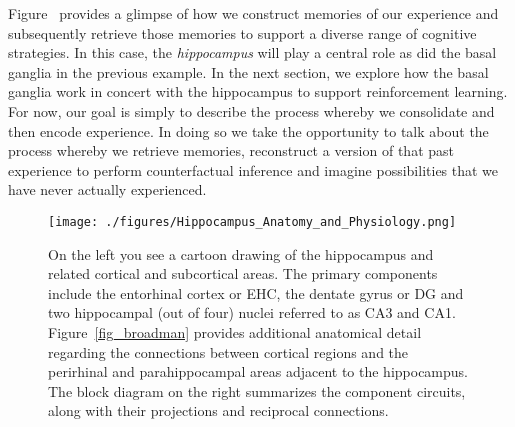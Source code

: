 

Figure~{} provides a glimpse of how we construct memories of our experience and subsequently retrieve those memories to support a diverse range of cognitive strategies. In this case, the {\it{hippocampus}} will play a central role as did the basal ganglia in the previous example. In the next section, we explore how the basal ganglia work in concert with the hippocampus to support reinforcement learning. For now, our goal is simply to describe the process whereby we consolidate and then encode experience. In doing so we take the opportunity to talk about the process whereby we retrieve memories, reconstruct a version of that past experience to perform counterfactual inference and imagine possibilities that we have never actually experienced. 


\begin{figure}
%
  \begin{center}
    \texttt{[image: ./figures/Hippocampus\_Anatomy\_and\_Physiology.png]} %
  \end{center}
%
  \caption{On the left you see a cartoon drawing of the hippocampus and related cortical and subcortical areas. The primary components include the entorhinal cortex or EHC, the dentate gyrus or DG and two hippocampal (out of four) nuclei referred to as CA3 and CA1. Figure~\ref{fig_broadman} provides additional anatomical detail regarding the connections between cortical regions and the perirhinal and parahippocampal areas adjacent to the hippocampus. The block diagram on the right summarizes the component circuits, along with their projections and reciprocal connections.}
%
  \label{fig_hippo}
%
\end{figure}


